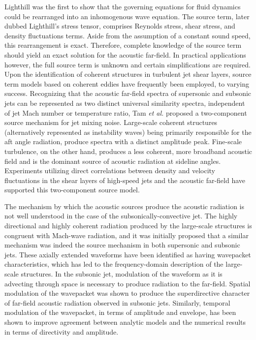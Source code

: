 \documentclass[english]{aiaa-tc}
\begin{document}
 Lighthill\cite{lighthill1963} was the first to show that the governing equations for fluid dynamics could be rearranged into an inhomogenous wave equation. The source term, later dubbed Lighthill's stress tensor, comprises Reynolds stress, shear stress, and density fluctuations terms. Aside from the assumption of a constant sound speed, this rearrangement is exact. Therefore, complete knowledge of the source term should yield an exact solution for the acoustic far-field. In practical applications however, the full source term is unknown and certain simplifications are required. Upon the identification of coherent structures in turbulent jet shear layers\cite{Arndt1997,Mollo-Christensen1967,crow1971,bgl74-1 }, source term models based on coherent eddies have frequently been employed, to varying success. Recognizing that the acoustic far-field spectra of supersonic and subsonic jets can be represented as two distinct universal similarity spectra, independent of jet Mach number or temperature ratio, Tam {\em et al.}\cite{Tam1996} proposed a two-component source mechanism for jet mixing noise. Large-scale coherent structures (alternatively represented as instability waves) being primarily responsible for the aft angle radiation, produce spectra with a distinct amplitude peak. Fine-scale turbulence, on the other hand,  produces a less coherent, more broadband acoustic field and is the dominant source of acoustic radiation at sideline angles. Experiments utilizing direct correlations between density and velocity fluctuations in the shear layers of high-speed jets and the acoustic far-field have supported this two-component source model\cite{Panda2002,Panda2005b}. 
 
The mechanism by which the acoustic sources produce the acoustic radiation is not well understood in the case of the subsonically-convective jet. The highly directional and highly coherent radiation produced by the large-scale structures is congruent with Mach-wave radiation, and it was initially proposed that a similar mechanism was indeed the source mechanism in both supersonic and subsonic jets\cite{Tam2008}. These axially extended waveforms have been identified as having wavepacket characteristics\cite{JorColo2013}, which has led to the frequency-domain description of the large-scale structures. In the subsonic jet, modulation of the waveform as it is advecting through space is necessary to produce radiation to the far-field. Spatial modulation of the wavepacket was shown to produce the superdirective character of far-field acoustic radiation observed in subsonic jets\cite{Crighton1990}. Similarly, temporal modulation of the wavepacket, in terms of amplitude and envelope, has been shown to improve agreement between analytic models and the numerical results in terms of directivity and amplitude\cite{Sandham2006,Cavalieri2010}. 
\end{document}
